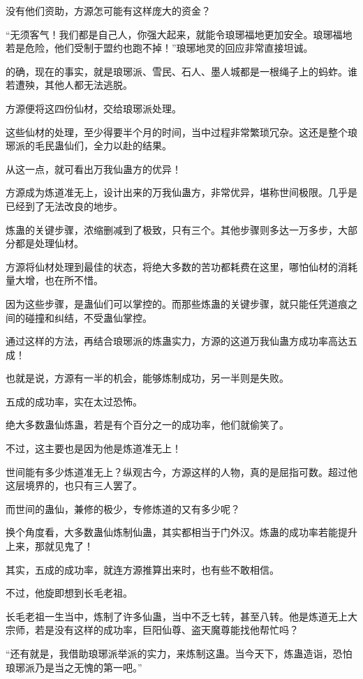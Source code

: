 \begin{this_body}
没有他们资助，方源怎可能有这样庞大的资金？

“无须客气！我们都是自己人，你强大起来，就能令琅琊福地更加安全。琅琊福地若是危险，他们受制于盟约也跑不掉！”琅琊地灵的回应非常直接坦诚。

的确，现在的事实，就是琅琊派、雪民、石人、墨人城都是一根绳子上的蚂蚱。谁若遭殃，其他人都无法逃脱。

方源便将这四份仙材，交给琅琊派处理。

这些仙材的处理，至少得要半个月的时间，当中过程非常繁琐冗杂。这还是整个琅琊派的毛民蛊仙们，全力以赴的结果。

从这一点，就可看出万我仙蛊方的优异！

方源成为炼道准无上，设计出来的万我仙蛊方，非常优异，堪称世间极限。几乎是已经到了无法改良的地步。

炼蛊的关键步骤，浓缩删减到了极致，只有三个。其他步骤则多达一万多步，大部分都是处理仙材。

方源将仙材处理到最佳的状态，将绝大多数的苦功都耗费在这里，哪怕仙材的消耗量大增，也在所不惜。

因为这些步骤，是蛊仙们可以掌控的。而那些炼蛊的关键步骤，就只能任凭道痕之间的碰撞和纠结，不受蛊仙掌控。

通过这样的方法，再结合琅琊派的炼蛊实力，方源的这道万我仙蛊方成功率高达五成！

也就是说，方源有一半的机会，能够炼制成功，另一半则是失败。

五成的成功率，实在太过恐怖。

绝大多数蛊仙炼蛊，若是有个百分之一的成功率，他们就偷笑了。

不过，这主要也是因为他是炼道准无上！

世间能有多少炼道准无上？纵观古今，方源这样的人物，真的是屈指可数。超过他这层境界的，也只有三人罢了。

而世间的蛊仙，兼修的极少，专修炼道的又有多少呢？

换个角度看，大多数蛊仙炼制仙蛊，其实都相当于门外汉。炼蛊的成功率若能提升上来，那就见鬼了！

其实，五成的成功率，就连方源推算出来时，也有些不敢相信。

不过，他旋即想到长毛老祖。

长毛老祖一生当中，炼制了许多仙蛊，当中不乏七转，甚至八转。他是炼道无上大宗师，若是没有这样的成功率，巨阳仙尊、盗天魔尊能找他帮忙吗？

“还有就是，我借助琅琊派举派的实力，来炼制这蛊。当今天下，炼蛊造诣，恐怕琅琊派乃是当之无愧的第一吧。”


\end{this_body}

